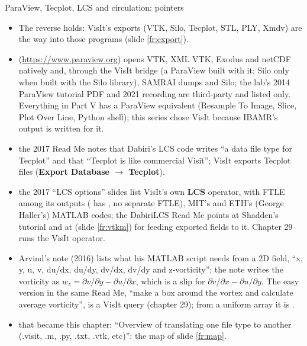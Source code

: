 \documentclass[aspectratio=169,11pt]{beamer}
\newcommand{\gui}[1]{\textsf{\textbf{#1}}}
\begin{document}
\begin{frame}{ParaView, Tecplot, LCS and circulation: pointers}
\label{fr:others}
\footnotesize
\begin{itemize}
  \item The reverse holds: VisIt's exports (VTK, Silo, Tecplot, STL, PLY, Xmdv) are the way into those programs (slide \ref{fr:export}).
  \item {} (\url{https://www.paraview.org}) opens VTK, XML VTK, Exodus and netCDF natively and, through the VisIt bridge (a ParaView built with it; Silo only when built with the Silo library), SAMRAI dumps and Silo; the lab's 2014 ParaView tutorial PDF and 2021 recording are third-party and listed only. Everything in Part V has a ParaView equivalent (Resample To Image, Slice, Plot Over Line, Python shell); this series chose VisIt because IBAMR's output is written for it.
  \item {} the 2017 Read Me notes that Dabiri's LCS code writes ``a data file type for Tecplot'' and that ``Tecplot is like commercial Visit''; VisIt exports Tecplot files (\gui{Export Database $\to$ Tecplot}).
  \item {} the 2017 ``LCS options'' slides list VisIt's own \gui{LCS} operator, with FTLE among its outputs ( has , no separate FTLE), MIT's and ETH's (George Haller's) MATLAB codes; the DabiriLCS Read Me points at Shadden's tutorial and at  (slide \ref{fr:vtkm}) for feeding exported fields to it. Chapter 29 runs the VisIt operator.
  \item {} Arvind's note (2016) lists what his MATLAB script needs from a 2D field, ``x, y, u, v, du/dx, du/dy, dv/dx, dv/dy and z-vorticity''; the note writes the vorticity as $w_z = \partial v/\partial y - \partial u/\partial x$, which is a slip for $\partial v/\partial x - \partial u/\partial y$. The easy version in the same Read Me, ``make a box around the vortex and calculate average vorticity'', is a VisIt query (chapter 29); from a uniform array it is .
  \item {} that became this chapter: ``Overview of translating one file type to another (.visit, .m, .py, .txt, .vtk, etc)'': the map of slide \ref{fr:map}.
\end{itemize}
\end{frame}
\end{document}
